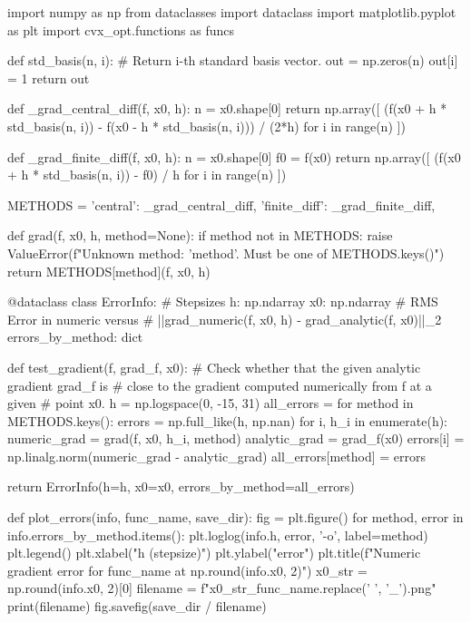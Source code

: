 \documentclass{homework}
\begin{document}
\begin{center}
\begin{python}
import numpy as np
from dataclasses import dataclass
import matplotlib.pyplot as plt
import cvx_opt.functions as funcs


def std_basis(n, i):
    # Return i-th standard basis vector.
    out = np.zeros(n)
    out[i] = 1
    return out

def _grad_central_diff(f, x0, h):
    n = x0.shape[0]
    return np.array([
        (f(x0 + h * std_basis(n, i)) - f(x0 - h * std_basis(n, i))) / (2*h)
        for i in range(n)
    ])
    
def _grad_finite_diff(f, x0, h):
    n = x0.shape[0]
    f0 = f(x0)
    return np.array([
        (f(x0 + h * std_basis(n, i)) - f0) / h
        for i in range(n)
    ])
    

METHODS = {
    'central': _grad_central_diff,
    'finite_diff': _grad_finite_diff,
}
    

def grad(f, x0, h, method=None):
    if method not in METHODS:
        raise ValueError(f"Unknown method: '{method}'. Must be one of {METHODS.keys()}")
    return METHODS[method](f, x0, h)
    

@dataclass
class ErrorInfo:
    # Stepsizes
    h: np.ndarray
    x0: np.ndarray
    # RMS Error in numeric versus
    # ||grad_numeric(f, x0, h) - grad_analytic(f, x0)||_2
    errors_by_method: dict


def test_gradient(f, grad_f, x0):
    # Check whether that the given analytic gradient grad_f is 
    # close to the gradient computed numerically from f at a given
    # point x0.
    h = np.logspace(0, -15, 31)
    all_errors = {}
    for method in METHODS.keys():
        errors = np.full_like(h, np.nan)
        for i, h_i in enumerate(h):
            numeric_grad = grad(f, x0, h_i, method)
            analytic_grad = grad_f(x0)
            errors[i] = np.linalg.norm(numeric_grad - analytic_grad)
        all_errors[method] = errors

    
    return ErrorInfo(h=h, x0=x0, errors_by_method=all_errors)


def plot_errors(info, func_name, save_dir):
    fig = plt.figure()
    for method, error in info.errors_by_method.items():
        plt.loglog(info.h, error, '-o', label=method)
    plt.legend()
    plt.xlabel("h (stepsize)")
    plt.ylabel("error")
    plt.title(f"Numeric gradient error for {func_name} \n at {np.round(info.x0, 2)}")
    x0_str = np.round(info.x0, 2)[0]
    filename = f"{x0_str}_{func_name.replace(' ', '_')}.png"
    print(filename)
    fig.savefig(save_dir / filename)
        

\end{python}
\end{center}
\end{document}
